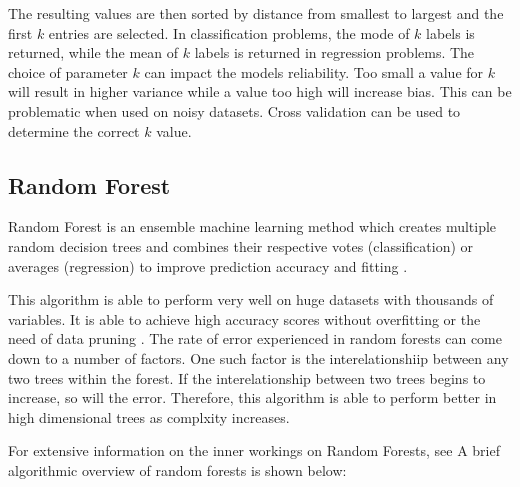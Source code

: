 The resulting values are then sorted by distance from smallest to largest and the first $k$ entries are selected. 
In classification problems, the mode of $k$ labels is returned, while the mean of $k$ labels is returned in regression problems.
The choice of parameter $k$ can impact the models reliability. Too small a value for $k$ will result in higher variance while a value too high will increase bias. 
This can be problematic when used on noisy datasets. Cross validation can be used to determine the correct $k$ value.

\subsection{Random Forest}
\label{sec:rand}
Random Forest is an ensemble machine learning method which creates multiple random decision trees and combines their respective votes (classification) or averages (regression) to improve prediction accuracy and fitting \cite{rf}.


This algorithm is able to perform very well on huge datasets with thousands of variables. 
It is able to achieve high accuracy scores without overfitting or the need of data pruning \cite{8074494}.
The rate of error experienced in random forests can come down to a number of factors.
One such factor is the interelationshiip between any two trees within the forest. 
If the interelationship between two trees begins to increase, so will the error.
Therefore, this algorithm is able to perform better in high dimensional trees as complxity increases.
 
For extensive information on the inner workings on Random Forests, see \cite{10.5555/2503308.2343682}
A brief algorithmic overview of random forests \cite{rf} is shown below:

